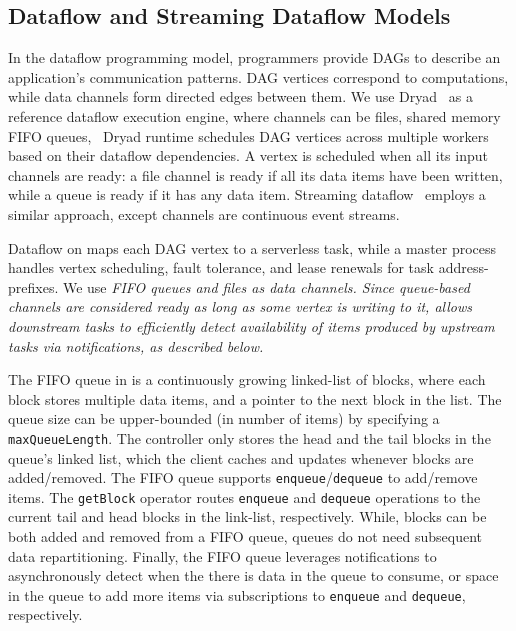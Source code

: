 \subsection{Dataflow and Streaming Dataflow Models}
\label{ssec:dflow}

In the dataflow programming model, programmers provide DAGs to describe 
an application's communication patterns. DAG vertices correspond to computations,
while data channels form directed edges between them. We use
Dryad~\cite{dryad} as a reference dataflow execution engine, where 
channels can be files, shared memory FIFO queues, \etc~Dryad runtime 
schedules DAG vertices across multiple workers based on their 
dataflow dependencies. A vertex is scheduled when 
all its input channels are ready: a file channel is ready if all its data 
items have been written, while a queue is ready if it has any data item. 
Streaming dataflow~\cite{streamscope} employs a similar
approach, except channels are continuous event streams.

Dataflow on \jiffy maps each DAG vertex to a serverless task,
while a master process handles vertex scheduling,
fault tolerance, and lease renewals for task address-prefixes. We use \sl FIFO
queues and files as data channels. Since queue-based channels are considered 
ready as long as some vertex is writing to it, \sl allows downstream tasks 
to efficiently detect availability of items produced by upstream tasks 
via notifications, as described below.

 The FIFO queue in \jiffy is a continuously growing linked-list of blocks, where each block stores multiple data items, and a pointer to the next block in the list. The queue size can be upper-bounded (in number of items) by specifying a \texttt{maxQueueLength}. The controller only stores the head and the tail blocks in the queue's linked list, which the client caches and updates whenever blocks are added/removed. The FIFO queue supports \texttt{enqueue}/\texttt{dequeue} to add/remove items. The \texttt{getBlock} operator routes \texttt{enqueue} and \texttt{dequeue} operations to the current tail and head blocks in the link-list, respectively. While, blocks can be both added and removed from a FIFO queue, queues do not need subsequent data repartitioning. Finally, the FIFO queue leverages \jiffy notifications to asynchronously detect when the there is data in the queue to consume, or space in the queue to add more items via subscriptions to \texttt{enqueue} and \texttt{dequeue}, respectively. 


